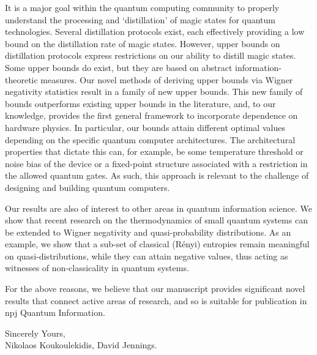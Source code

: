 \documentclass[11pt]{letter}
\begin{document}
It is a major goal within the quantum computing community to properly understand the processing and `distillation' of magic states for quantum technologies. Several distillation protocols exist, each effectively providing a low bound on the distillation rate of magic states. However, upper bounds on distillation protocols express restrictions on our ability to distill magic states. Some upper bounds do exist, but they are based on abstract information-theoretic measures. Our novel methods of deriving upper bounds via Wigner negativity statistics result in a family of new upper bounds. This new family of bounds outperforms existing upper bounds in the literature, and, to our knowledge, provides the first general framework to incorporate dependence on hardware physics. In particular, our bounds attain different optimal values depending on the specific quantum computer architectures. The architectural properties that dictate this can, for example, be some temperature threshold or noise bias of the device or a fixed-point structure associated with a restriction in the allowed quantum gates.  As such, this approach is relevant to the challenge of designing and building quantum computers.


Our results are also of interest to other areas in quantum information science. We show that recent research on the thermodynamics of small quantum systems can be extended to Wigner negativity and quasi-probability distributions. As an example, we show that a sub-set of classical (R\'{e}nyi) entropies remain meaningful on quasi-distributions, while they can attain negative values, thus acting as witnesses of non-classicality in quantum systems.

For the above reasons, we believe that our manuscript provides significant novel results that connect active areas of research, and so is suitable for publication in npj Quantum Information.

\vspace{1cm}
\hspace{8cm}
\begin{minipage}{9cm}
\flushleft
Sincerely Yours,\\

Nikolaos Koukoulekidis, David Jennings.
\end{minipage}
\end{document}
